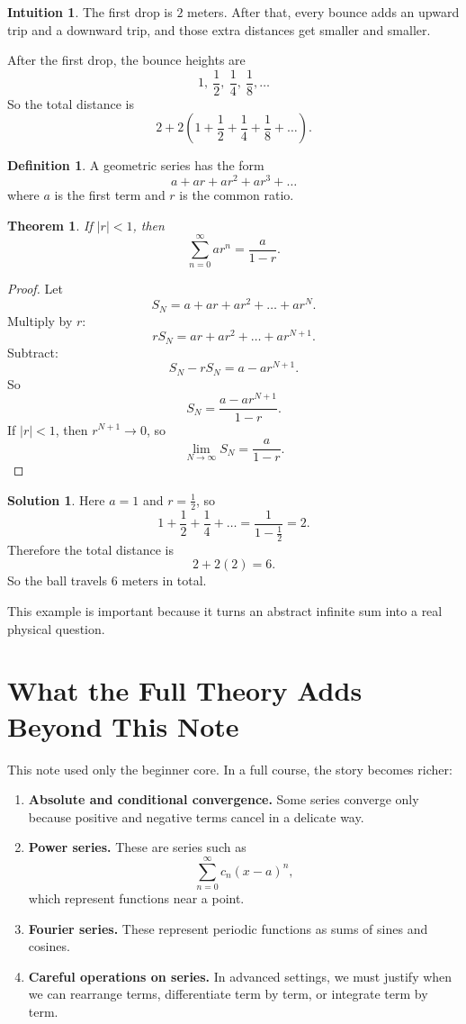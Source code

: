 \documentclass[11pt,a4paper]{article}
\theoremstyle{definition}
\newtheorem*{intuition}{Intuition}
\newtheorem*{definitionblock}{Definition}
\newtheorem*{solution}{Solution}
\theoremstyle{plain}
\newtheorem*{theoremblock}{Theorem}
\begin{document}
\begin{intuition}
The first drop is \(2\) meters.
After that, every bounce adds an upward trip and a downward trip, and those extra distances get smaller and smaller.
\end{intuition}

After the first drop, the bounce heights are
\[
1,\ \frac{1}{2},\ \frac{1}{4},\ \frac{1}{8},\dots
\]
So the total distance is
\[
2 + 2\left(1+\frac{1}{2}+\frac{1}{4}+\frac{1}{8}+\dots\right).
\]

\begin{definitionblock}
A geometric series has the form
\[
a+ar+ar^2+ar^3+\dots
\]
where \(a\) is the first term and \(r\) is the common ratio.
\end{definitionblock}

\begin{theoremblock}
If \(|r|<1\), then
\[
\sum_{n=0}^{\infty} ar^n = \frac{a}{1-r}.
\]
\end{theoremblock}

\begin{proof}
Let
\[
S_N = a+ar+ar^2+\dots+ar^N.
\]
Multiply by \(r\):
\[
rS_N = ar+ar^2+\dots+ar^{N+1}.
\]
Subtract:
\[
S_N-rS_N = a-ar^{N+1}.
\]
So
\[
S_N=\frac{a-ar^{N+1}}{1-r}.
\]
If \(|r|<1\), then \(r^{N+1}\to 0\), so
\[
\lim_{N\to\infty} S_N=\frac{a}{1-r}.
\]
\end{proof}

\begin{solution}
Here \(a=1\) and \(r=\frac{1}{2}\), so
\[
1+\frac{1}{2}+\frac{1}{4}+\dots = \frac{1}{1-\frac{1}{2}}=2.
\]
Therefore the total distance is
\[
2 + 2(2) = 6.
\]
So the ball travels \(\boxed{6\text{ meters}}\) in total.
\end{solution}

This example is important because it turns an abstract infinite sum into a real physical question.

\section{What the Full Theory Adds Beyond This Note}

This note used only the beginner core.
In a full course, the story becomes richer:

\begin{enumerate}
  \item \textbf{Absolute and conditional convergence.}
  Some series converge only because positive and negative terms cancel in a delicate way.

  \item \textbf{Power series.}
  These are series such as
  \[
  \sum_{n=0}^{\infty} c_n(x-a)^n,
  \]
  which represent functions near a point.

  \item \textbf{Fourier series.}
  These represent periodic functions as sums of sines and cosines.

  \item \textbf{Careful operations on series.}
  In advanced settings, we must justify when we can rearrange terms, differentiate term by term, or integrate term by term.
\end{enumerate}
\end{document}
